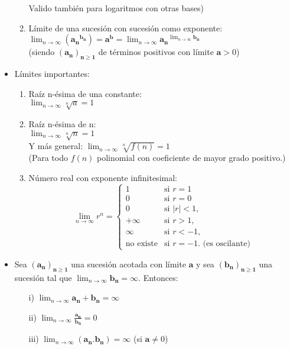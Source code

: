 \documentclass[a4paper,11pt]{report}
\begin{document}
\begin{itemize}
\begin{enumerate}
Valido también para logaritmos con otras bases)
\item Límite de una sucesión con sucesión como exponente: \\[5pt]
$\displaystyle \lim_{n\to\infty} (\mathbf{{a_n}^{b_n}}) = \mathbf{a^b} = \lim_{n\to\infty} \mathbf{a_n}^{ \lim_{n\to\infty} \mathbf{b_n}}$  \\[4pt]
(siendo $\mathbf{(a_n)_{n \geqslant 1}}$ de términos positivos con límite $\mathbf{a} > 0$)
\end{enumerate}
\item Límites importantes:
\begin{enumerate}
\item Raíz n-ésima de una constante: \\
$\displaystyle \lim_{n\to\infty} \sqrt[n]{a} = 1$
\item Raíz n-ésima de n: \\
$\displaystyle \lim_{n\to\infty} \sqrt[n]{n} = 1$ \\[5pt]
Y más general: $\displaystyle \lim_{n\to\infty} \sqrt[n]{f(n)} = 1$ \\
(Para todo $f(n)$ polinomial con coeficiente de mayor grado positivo.)
\item Número real con exponente infinitesimal:
\begin{equation*}
\lim_{n\to\infty} r^n = \left\{
\begin{array}{cl}
1 & \text{si } r=1 \\
0 & \text{si } r=0 \\
0 & \text{si } |r| < 1,  \\
+ \infty & \text{si } r >1, \\
\infty & \text{si } r < -1,  \\
\text{no existe} & \text{si } r=-1. \text{ (es oscilante)}
\end{array} \right.
\end{equation*}
\end{enumerate}
\item Sea $\mathbf{(a_n)_{n \geqslant 1}}$ una sucesión acotada con límite $\mathbf{a}$ y sea $\mathbf{(b_n)_{n \geqslant 1}}$ una sucesión tal que $\displaystyle \lim_{n\to\infty} \mathbf{b_n} = \infty$. Entonces:
\begin{itemize}
\item[i)] $\displaystyle \lim_{n\to\infty} \mathbf{{a_n} + {b_n}} = \infty$ 
\item[ii)] $\displaystyle \lim_{n\to\infty} \frac{\mathbf{a_n}}{\mathbf{b_n}} = 0$
\item[iii)] $\displaystyle \lim_{n\to\infty} (\mathbf{{a_n}.{b_n}}) = \infty$ (si $\mathbf{a} \neq 0$)

\end{itemize}
\end{itemize}
\end{document}
